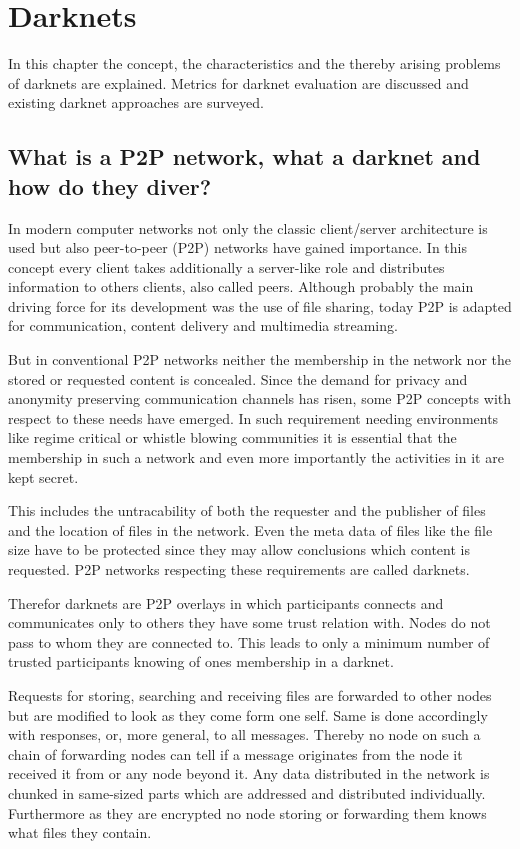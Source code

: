 \chapter{Darknets}


In this chapter the concept, the characteristics and the thereby arising problems of darknets are explained. Metrics for darknet evaluation are discussed and existing darknet approaches are surveyed.
\section{What is a P2P network, what a darknet and how do they diver?}

In modern computer networks not only the classic client/server architecture is used but also peer-to-peer (P2P) networks have gained importance. In this concept every client takes additionally a server-like role and distributes information to others clients, also called peers. Although probably the main driving force for its development was the use of file sharing, today P2P is adapted for communication, content delivery and multimedia streaming.

But in conventional P2P networks neither the membership in the network nor the stored or requested content is concealed. Since the demand for privacy and anonymity preserving communication channels has risen, some P2P concepts with respect to these needs have emerged. In such requirement needing environments like regime critical or whistle blowing communities it is essential that the membership in such a network and even more importantly the activities in it are kept secret.

This includes the untracability of both the requester and the publisher of files and the location of files in the network. Even the meta data of files like the file size have to be protected since they may allow conclusions which content is requested. P2P networks respecting these requirements are called darknets.

Therefor darknets are P2P overlays in which participants connects and communicates only to others they have some trust relation with. Nodes do not pass to whom they are connected to. This leads to only a minimum number of trusted participants knowing of ones membership in a darknet. 

Requests for storing, searching and receiving files are forwarded to other nodes but are modified to look as they come form one self. Same is done accordingly with responses, or, more general, to all messages. Thereby no node on such a chain of forwarding nodes can tell if a message originates from the node it received it from or any node beyond it. Any data distributed in the network is chunked in same-sized parts which are addressed and distributed individually. Furthermore as they are encrypted no node storing or forwarding them knows what files they contain.


